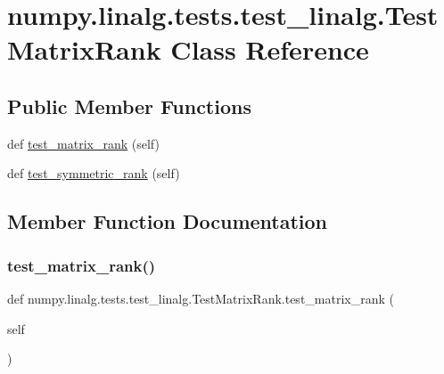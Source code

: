 \hypertarget{classnumpy_1_1linalg_1_1tests_1_1test__linalg_1_1TestMatrixRank}{}\section{numpy.\+linalg.\+tests.\+test\+\_\+linalg.\+Test\+Matrix\+Rank Class Reference}
\label{classnumpy_1_1linalg_1_1tests_1_1test__linalg_1_1TestMatrixRank}
\subsection*{Public Member Functions}
\begin{DoxyCompactItemize}
\item 
def \hyperlink{classnumpy_1_1linalg_1_1tests_1_1test__linalg_1_1TestMatrixRank_a15d7e3ad4190eb58a85d9da2bc9ba1e1}{test\+\_\+matrix\+\_\+rank} (self)
\item 
def \hyperlink{classnumpy_1_1linalg_1_1tests_1_1test__linalg_1_1TestMatrixRank_a42ee8d301a4e26e0ba8ab6a74862b15d}{test\+\_\+symmetric\+\_\+rank} (self)
\end{DoxyCompactItemize}


\subsection{Member Function Documentation}
\mbox{\label{classnumpy_1_1linalg_1_1tests_1_1test__linalg_1_1TestMatrixRank_a15d7e3ad4190eb58a85d9da2bc9ba1e1}} 
\subsubsection{\texorpdfstring{test\+\_\+matrix\+\_\+rank()}{test\_matrix\_rank()}}
{\footnotesize\ttfamily def numpy.\+linalg.\+tests.\+test\+\_\+linalg.\+Test\+Matrix\+Rank.\+test\+\_\+matrix\+\_\+rank (\begin{DoxyParamCaption}\item[{}]{self }\end{DoxyParamCaption})}

